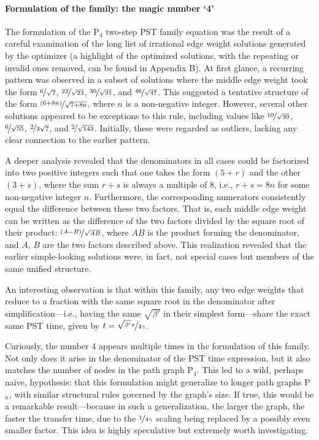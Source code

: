 \documentclass[reprint, aps, 12pt, floatfix]{revtex4-2}
\begin{document}
\paragraph{Formulation of the family: the magic number `4'}
The formulation of the P$_4$ two-step PST family equation was the result of a careful examination of the long list of irrational edge weight solutions generated by the optimizer (a highlight of the optimized solutions, with the repeating or invalid ones removed, can be found in Appendix B). At first glance, a recurring pattern was observed in a subset of solutions where the middle edge weight took the form $\nicefrac{6}{\sqrt{7}}$, $\nicefrac{22}{\sqrt{23}}$, $\nicefrac{30}{\sqrt{31}}$, and $\nicefrac{46}{\sqrt{47}}$. This suggested a tentative structure of the form $\nicefrac{(6 + 8n)}{\sqrt{7 + 8n}}$, where $n$ is a non-negative integer. However, several other solutions appeared to be exceptions to this rule, including values like $\nicefrac{10}{\sqrt{39}}$, $\nicefrac{6}{\sqrt{55}}$, $\nicefrac{2}{3\sqrt{7}}$, and $\nicefrac{2}{\sqrt{143}}$. Initially, these were regarded as outliers, lacking any clear connection to the earlier pattern.

A deeper analysis revealed that the denominators in all cases could be factorized into two positive integers such that one takes the form $(5 + r)$ and the other $(3 + s)$, where the sum $r + s$ is always a multiple of 8, i.e., $r + s = 8n$ for some non-negative integer $n$. Furthermore, the corresponding numerators consistently equal the difference between these two factors. That is, each middle edge weight can be written as the difference of the two factors divided by the square root of their product: $\nicefrac{(A - B)}{\sqrt{AB}}$, where $AB$ is the product forming the denominator, and $A$, $B$ are the two factors described above. This realization revealed that the earlier simple-looking solutions were, in fact, not special cases but members of the same unified structure.

An interesting observation is that within this family, any two edge weights that reduce to a fraction with the same square root in the denominator after simplification—i.e., having the same $\sqrt{\beta'}$ in their simplest form—share the exact same PST time, given by $t = \nicefrac{\sqrt{\beta'} \pi}{4\gamma}$.

Curiously, the number 4 appears multiple times in the formulation of this family. Not only does it arise in the denominator of the PST time expression, but it also matches the number of nodes in the path graph P$_4$. This led to a wild, perhaps naive, hypothesis: that this formulation might generalize to longer path graphs P$_n$, with similar structural rules governed by the graph’s size. If true, this would be a remarkable result—because in such a generalization, the larger the graph, the faster the transfer time, due to the $\nicefrac{1}{4\gamma}$ scaling being replaced by a possibly even smaller factor. This idea is highly speculative but extremely worth investigating.
\end{document}
